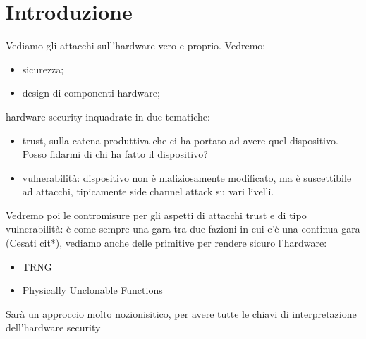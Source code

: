 \documentclass[oneside, 12pt]{extbook}
\begin{document}
\chapter{Introduzione}
Vediamo gli attacchi sull'hardware vero e proprio. Vedremo:
\begin{itemize}
	\item sicurezza;
	\item design di componenti hardware;
\end{itemize}
hardware security inquadrate in due tematiche:
\begin{itemize}
	\item trust, sulla catena produttiva che ci ha portato ad avere quel dispositivo. Posso fidarmi di chi ha fatto il dispositivo?
	\item vulnerabilità: dispositivo non è maliziosamente modificato, ma è suscettibile ad attacchi, tipicamente side channel attack su vari livelli.
\end{itemize}
Vedremo poi le contromisure per gli aspetti di attacchi trust e di tipo vulnerabilità: è come sempre una gara tra due fazioni in cui c'è una continua gara (Cesati cit*), vediamo anche delle primitive per rendere sicuro l'hardware:
\begin{itemize}
	\item TRNG
	\item Physically Unclonable Functions
\end{itemize}
Sarà un approccio molto nozionisitico, per avere tutte le chiavi di interpretazione dell'hardware security
\end{document}
